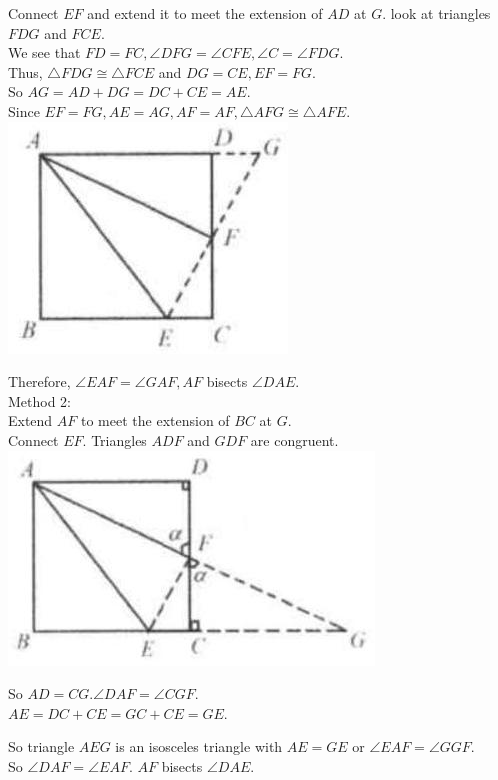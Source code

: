 \documentclass{article}
\begin{document}
Connect \(E F\) and extend it to meet the extension of \(A D\) at \(G\). look at triangles \(F D G\) and \(F C E\).\\
We see that \(F D=F C, \angle D F G=\angle C F E, \angle C=\angle F D G\).\\
Thus, \(\triangle F D G \cong \triangle F C E\) and \(D G=C E, E F=F G\).\\
So \(A G=A D+D G=D C+C E=A E\).\\
Since \(E F=F G, A E=A G, A F=A F, \triangle A F G \cong \triangle A F E\).\\
\centering
\includegraphics[width=\textwidth]{images/060(1).jpg}

Therefore, \(\angle E A F=\angle G A F, A F\) bisects \(\angle D A E\).\\
Method 2:\\
Extend \(A F\) to meet the extension of \(B C\) at \(G\).\\
Connect \(E F\). Triangles \(A D F\) and \(G D F\) are congruent.\\
\centering
\includegraphics[width=\textwidth]{images/060(2).jpg}

So \(A D=C G . \angle D A F=\angle C G F\).\\
\(A E=D C+C E=G C+C E=G E\).

So triangle \(A E G\) is an isosceles triangle with \(A E=G E\) or \(\angle E A F=\angle G G F\).\\
So \(\angle D A F=\angle E A F\). \(A F\) bisects \(\angle D A E\).
\end{document}
